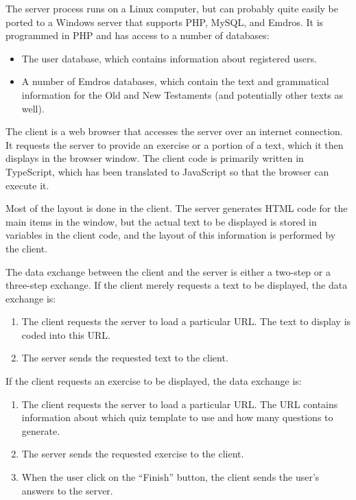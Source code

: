 \documentclass[11pt,oneside,a4paper]{memoir}
\begin{document}
The server process runs on a Linux computer, but can probably quite easily be ported to a Windows server
that supports PHP, MySQL, and Emdros. It is programmed in PHP and has access to a number of
databases:

\begin{itemize}
\item The user database, which contains information about
  registered users.
\item A number of Emdros databases, which contain the text and grammatical information for the Old
  and New Testaments (and potentially other texts as well).
\end{itemize}

The client is a web browser that accesses the server over an
internet connection. It requests the server to provide an exercise or a portion of a text, which it
then displays in the browser window. The client code is primarily written in
TypeScript, which has been translated to JavaScript so that the
browser can execute it.

Most of the layout is done in the client. The server generates HTML code for the main items in the
window, but the actual text to be displayed is stored in variables in the client code, and the layout of
this information is performed by the client.

The data exchange between the client and the server is either a two-step or a three-step exchange.
If the client merely requests a text to be displayed, the data exchange is:

\begin{enumerate}
\item The client requests the server to load a particular URL. The text to display is coded into
  this URL.
\item The server sends the requested text to the client.
\end{enumerate}

If the client requests an exercise to be displayed, the data exchange is:

\begin{enumerate}
\item The client requests the server to load a particular URL. The URL contains information about which
  quiz template to use and how many questions to generate.
\item The server sends the requested exercise to the client.
\item When the user click on the ``Finish'' button, the
  client sends the user's answers to the server.
\end{enumerate}
\end{document}
